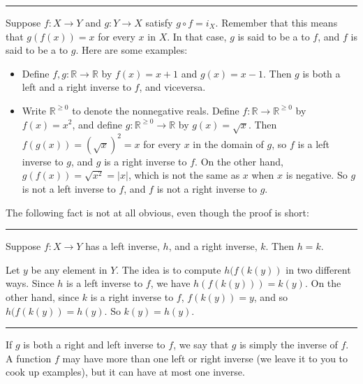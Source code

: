\documentclass[letterpaper,10pt,english]{sphinxmanual}
\begin{document}
\bigskip\hrule\bigskip


\sphinxAtStartPar
Suppose \(f : X \to Y\) and \(g : Y \to X\) satisfy \(g \circ f = i_X\). Remember that this means that \(g(f(x)) = x\) for every \(x\) in \(X\). In that case, \(g\) is said to be a  to \(f\), and \(f\) is said to be a  to \(g\). Here are some examples:
\begin{itemize}
\item {} 
\sphinxAtStartPar
Define \(f, g : \mathbb{R} \to \mathbb{R}\) by \(f(x) = x + 1\) and \(g(x) = x - 1\). Then \(g\) is both a left and a right inverse to \(f\), and vice\sphinxhyphen{}versa.

\item {} 
\sphinxAtStartPar
Write \(\mathbb{R}^{\geq 0}\) to denote the nonnegative reals. Define \(f : \mathbb{R} \to \mathbb{R}^{\geq 0}\) by \(f(x) = x^2\), and define \(g : \mathbb{R}^{\geq 0} \to \mathbb{R}\) by \(g(x) = \sqrt x\). Then \(f(g(x)) = (\sqrt x)^2 = x\) for every \(x\) in the domain of \(g\), so \(f\) is a left inverse to \(g\), and \(g\) is a right inverse to \(f\). On the other hand, \(g(f(x)) = \sqrt{x^2} = | x |\), which is not the same as \(x\) when \(x\) is negative. So \(g\) is not a left inverse to \(f\), and \(f\) is not a right inverse to \(g\).

\end{itemize}

\sphinxAtStartPar
The following fact is not at all obvious, even though the proof is short:


\bigskip\hrule\bigskip


\sphinxAtStartPar
{} Suppose \(f : X \to Y\) has a left inverse, \(h\), and a right inverse, \(k\). Then \(h = k\).

\sphinxAtStartPar
{} Let \(y\) be any element in \(Y\). The idea is to compute \(h(f(k(y))\) in two different ways. Since \(h\) is a left inverse to \(f\), we have \(h(f(k(y))) = k(y)\). On the other hand, since \(k\) is a right inverse to \(f\), \(f(k(y)) = y\), and so \(h(f(k(y)) = h(y)\). So \(k(y) = h(y)\).


\bigskip\hrule\bigskip


\sphinxAtStartPar
If \(g\) is both a right and left inverse to \(f\), we say that \(g\) is simply the inverse of \(f\). A function \(f\) may have more than one left or right inverse (we leave it to you to cook up examples), but it can have at most one inverse.
\end{document}
